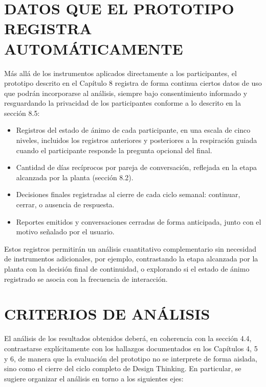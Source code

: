 \section{DATOS QUE EL PROTOTIPO REGISTRA AUTOMÁTICAMENTE}
Más allá de los instrumentos aplicados directamente a los participantes, el prototipo descrito en el Capítulo 8 registra de forma continua ciertos datos de uso que podrán incorporarse al análisis, siempre bajo consentimiento informado y resguardando la privacidad de los participantes conforme a lo descrito en la sección 8.5:

\begin{itemize}
    \item Registros del estado de ánimo de cada participante, en una escala de cinco niveles, incluidos los registros anteriores y posteriores a la respiración guiada cuando el participante responde la pregunta opcional del final.
    \item Cantidad de días recíprocos por pareja de conversación, reflejada en la etapa alcanzada por la planta (sección 8.2).
    \item Decisiones finales registradas al cierre de cada ciclo semanal: continuar, cerrar, o ausencia de respuesta.
    \item Reportes emitidos y conversaciones cerradas de forma anticipada, junto con el motivo señalado por el usuario.
\end{itemize}

Estos registros permitirán un análisis cuantitativo complementario sin necesidad de instrumentos adicionales, por ejemplo, contrastando la etapa alcanzada por la planta con la decisión final de continuidad, o explorando si el estado de ánimo registrado se asocia con la frecuencia de interacción.

\section{CRITERIOS DE ANÁLISIS}
El análisis de los resultados obtenidos deberá, en coherencia con la sección 4.4, contrastarse explícitamente con los hallazgos documentados en los Capítulos 4, 5 y 6, de manera que la evaluación del prototipo no se interprete de forma aislada, sino como el cierre del ciclo completo de Design Thinking. En particular, se sugiere organizar el análisis en torno a los siguientes ejes:

